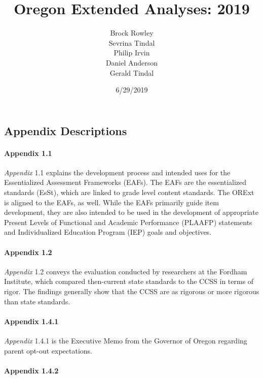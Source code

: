 \documentclass[]{article}
\title{Oregon Extended Analyses: 2019}
\author{Brock Rowley \\ Sevrina Tindal \\ Philip Irvin \\ Daniel Anderson \\ Gerald Tindal}
\date{6/29/2019}
\let\oldparagraph\paragraph
\renewcommand{\paragraph}[1]{\oldparagraph{#1}\mbox{}}
\begin{document}
\maketitle

{
\setcounter{tocdepth}{5}
\tableofcontents
}
\hypertarget{appendix-descriptions}{%
\subsection{Appendix Descriptions}\label{appendix-descriptions}}

\hypertarget{appendix-1.1}{%
\paragraph{Appendix 1.1}\label{appendix-1.1}}

\emph{Appendix} 1.1 explains the development process and intended uses
for the Essentialized Assessment Frameworks (EAFs). The EAFs are the
essentialized standards (EsSt), which are linked to grade level content
standards. The ORExt is aligned to the EAFs, as well. While the EAFs
primarily guide item development, they are also intended to be used in
the development of appropriate Present Levels of Functional and Academic
Performance (PLAAFP) statements and Individualized Education Program
(IEP) goals and objectives.

\hypertarget{appendix-1.2}{%
\paragraph{Appendix 1.2}\label{appendix-1.2}}

\emph{Appendix} 1.2 conveys the evaluation conducted by researchers at
the Fordham Institute, which compared then-current state standards to
the CCSS in terms of rigor. The findings generally show that the CCSS
are as rigorous or more rigorous than state standards.

\hypertarget{appendix-1.4.1}{%
\paragraph{Appendix 1.4.1}\label{appendix-1.4.1}}

\emph{Appendix} 1.4.1 is the Executive Memo from the Governor of Oregon
regarding parent opt-out expectations.

\hypertarget{appendix-1.4.2}{%
\paragraph{Appendix 1.4.2}\label{appendix-1.4.2}}
\end{document}
